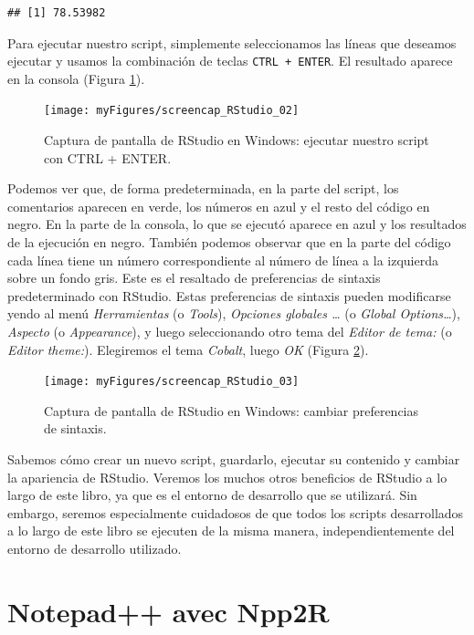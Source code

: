 \documentclass[
]{book}
\begin{document}
\begin{verbatim}
## [1] 78.53982
\end{verbatim}

Para ejecutar nuestro script, simplemente seleccionamos las líneas que deseamos ejecutar y usamos la combinación de teclas \texttt{CTRL\ +\ ENTER}. El resultado aparece en la consola (Figura \ref{fig:screenCapRStudio02}).

\begin{figure}
\texttt{[image: myFigures/screencap\_RStudio\_02]} \caption{Captura de pantalla de RStudio en Windows: ejecutar nuestro script con CTRL + ENTER.\label{fig:screenCapRStudio02}}\label{fig:screenCapRStudio02}
\end{figure}

Podemos ver que, de forma predeterminada, en la parte del script, los comentarios aparecen en verde, los números en azul y el resto del código en negro. En la parte de la consola, lo que se ejecutó aparece en azul y los resultados de la ejecución en negro.
También podemos observar que en la parte del código cada línea tiene un número correspondiente al número de línea a la izquierda sobre un fondo gris. Este es el resaltado de preferencias de sintaxis predeterminado con RStudio. Estas preferencias de sintaxis pueden modificarse yendo al menú \emph{Herramientas} (o \emph{Tools}), \emph{Opciones globales \ldots{}} (o \emph{Global Options\ldots{}}), \emph{Aspecto} (o \emph{Appearance}), y luego seleccionando otro tema del \emph{Editor de tema:} (o \emph{Editor theme:}). Elegiremos el tema \emph{Cobalt}, luego \emph{OK} (Figura \ref{fig:screenCapRStudio03}).

\begin{figure}
\texttt{[image: myFigures/screencap\_RStudio\_03]} \caption{Captura de pantalla de RStudio en Windows: cambiar preferencias de sintaxis.\label{fig:screenCapRStudio03}}\label{fig:screenCapRStudio03}
\end{figure}

Sabemos cómo crear un nuevo script, guardarlo, ejecutar su contenido y cambiar la apariencia de RStudio. Veremos los muchos otros beneficios de RStudio a lo largo de este libro, ya que es el entorno de desarrollo que se utilizará. Sin embargo, seremos especialmente cuidadosos de que todos los scripts desarrollados a lo largo de este libro se ejecuten de la misma manera, independientemente del entorno de desarrollo utilizado.

\hypertarget{notepad-avec-npp2r}{%
\section{Notepad++ avec Npp2R}\label{notepad-avec-npp2r}}
\end{document}
